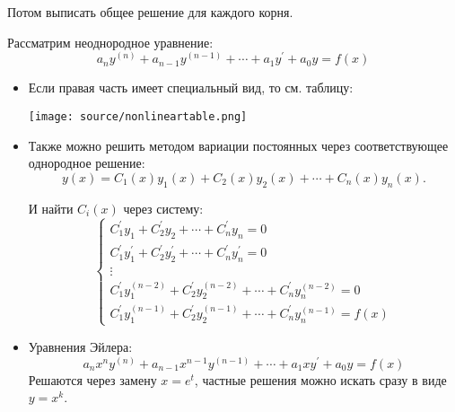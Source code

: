\documentclass[twoside, a4paperpt, fleqn]{extarticle}
\begin{document}
    Потом выписать общее решение для каждого корня.

    Рассматрим неоднородное уравнение:
    \begin{equation*}
        a_{n} y^{(n)}+a_{n-1} y^{(n-1)}+\cdots+a_{1} y^{\prime}+a_{0} y=f(x)
    \end{equation*}
   \begin{itemize}
       \item  Если правая часть имеет специальный вид, то см. таблицу:

    \texttt{[image: source/nonlineartable.png]}


    \item Также можно решить методом вариации постоянных через соответствующее однородное решение:
    $$y(x)=C_{1}(x) y_{1}(x)+C_{2}(x) y_{2}(x)+\cdots+C_{n}(x) y_{n}(x) .$$

    И найти $C_i(x)$ через систему:
    \begin{equation*}
        \left\{\begin{array}{c}
            C_{1}^{\prime} y_{1}+C_{2}^{\prime} y_{2}+\cdots+C_{n}^{\prime} y_{n}=0 \\
            C_{1}^{\prime} y_{1}^{\prime}+C_{2}^{\prime} y_{2}^{\prime}+\cdots+C_{n}^{\prime} y_{n}^{\prime}=0 \\
            \vdots \\
            C_{1}^{\prime} y_{1}^{(n-2)}+C_{2}^{\prime} y_{2}^{(n-2)}+\cdots+C_{n}^{\prime} y_{n}^{(n-2)}=0 \\
            C_{1}^{\prime} y_{1}^{(n-1)}+C_{2}^{\prime} y_{2}^{(n-1)}+\cdots+C_{n}^{\prime} y_{n}^{(n-1)}=f(x)
            \end{array}\right.
    \end{equation*}

    \item Уравнения Эйлера:
    \begin{equation*}
        a_{n} x^{n} y^{(n)}+a_{n-1} x^{n-1} y^{(n-1)}+\cdots+a_{1} x y^{\prime}+a_{0} y=f(x)    
    \end{equation*}
    Решаются через замену $x = e^t$, частные решения можно искать сразу в виде $y = x^k$.
\end{itemize}
\end{document}
